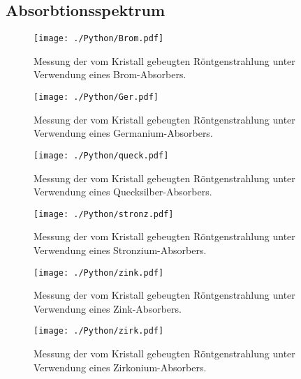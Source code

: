 \subsection{Absorbtionsspektrum}
\label{sec:absorption}

\begin{figure}
  \centering
  \texttt{[image: ./Python/Brom.pdf]}
  \caption{Messung der vom Kristall gebeugten Röntgenstrahlung unter Verwendung eines Brom-Absorbers.}
  \label{fig:brom}
\end{figure}

\begin{figure}
  \centering
  \texttt{[image: ./Python/Ger.pdf]}
  \caption{Messung der vom Kristall gebeugten Röntgenstrahlung unter Verwendung eines Germanium-Absorbers.}
  \label{fig:ger}
\end{figure}

\begin{figure}
  \centering
  \texttt{[image: ./Python/queck.pdf]}
  \caption{Messung der vom Kristall gebeugten Röntgenstrahlung unter Verwendung eines Quecksilber-Absorbers.}
  \label{fig:queck}
\end{figure}

\begin{figure}
  \centering
  \texttt{[image: ./Python/stronz.pdf]}
  \caption{Messung der vom Kristall gebeugten Röntgenstrahlung unter Verwendung eines Stronzium-Absorbers.}
  \label{fig:stronz}
\end{figure}

\begin{figure}
  \centering
  \texttt{[image: ./Python/zink.pdf]}
  \caption{Messung der vom Kristall gebeugten Röntgenstrahlung unter Verwendung eines Zink-Absorbers.}
  \label{fig:zink}
\end{figure}

\begin{figure}
  \centering
  \texttt{[image: ./Python/zirk.pdf]}
  \caption{Messung der vom Kristall gebeugten Röntgenstrahlung unter Verwendung eines Zirkonium-Absorbers.}
  \label{fig:brom}
\end{figure}
